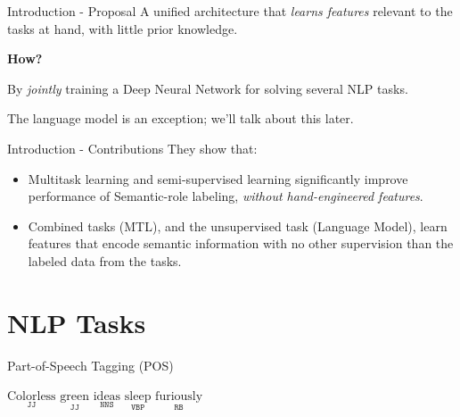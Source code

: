 \documentclass[handout]{beamer} %
\begin{document}
  \begin{frame}{Introduction - Proposal}
      A unified architecture that \textit{learns features} relevant to the tasks
      at hand, with little prior knowledge.\pause%

        \textbf{How?}\pause%

    By \textit{jointly} training a Deep Neural Network for solving several NLP
    tasks.\pause%

    {\footnotesize\color{gray}The language model is an exception; we'll talk about this
    later.}

  \end{frame}

  \begin{frame}{Introduction - Contributions}
      They show that:
      \begin{itemize}[<+->]
          \item Multitask learning and semi-supervised learning significantly
              improve performance of Semantic-role labeling, \textit{without
              hand-engineered features}.
          \item Combined tasks (MTL), and the unsupervised task (Language
              Model), learn features that encode semantic information with no
              other supervision than the labeled data from the tasks.
          
      \end{itemize}


  \end{frame}


  \section{NLP Tasks}
  \begin{frame}{Part-of-Speech Tagging (POS)}

      \begin{center}
          $\underset{\texttt{JJ}}{\text{Colorless}}$
          $\underset{\texttt{JJ}}{\text{green}}$
          $\underset{\texttt{NNS}}{\text{ideas}}$
          $\underset{\texttt{VBP}}{\text{sleep}}$
          $\underset{\texttt{RB}}{\text{furiously}}$
      \end{center}
      
  \end{frame}
\end{document}
